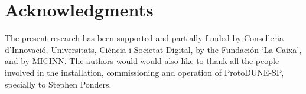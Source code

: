 \section{Acknowledgments}
\noindent The present research has been supported and partially funded by Conselleria d’Innovació, Universitats, Ciència i Societat Digital, by the Fundación `La Caixa', and by MICINN. The authors would would also like to thank all the people involved in the installation, commissioning and operation of ProtoDUNE-SP, specially to Stephen Ponders. 